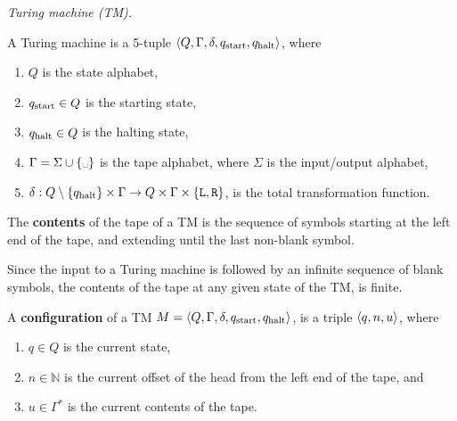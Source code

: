\begin{definition} \emph{Turing machine (TM).}

A Turing machine is a 5-tuple $\mathopen{}\left\langle{Q,\Gamma,\delta,\ensuremath{q_{\text{start}}},\ensuremath{q_{\text{halt}}}}\right\rangle\mathclose{}$, where

\begin{enumerate}

\item $Q$ is the state alphabet,

\item $q_{\text{start}}\in Q$ is the starting state,

\item $q_{\text{halt}}\in Q$ is the halting state,

\item $\Gamma=\Sigma\cup\set{\text{\textvisiblespace}}$ is the tape alphabet,
where $\Sigma$ is the input/output alphabet,

\item $\delta:Q\setminus\mathopen{}\left\{{q_{\text{halt}}}\right\}\mathclose{}\times\Gamma \rightarrow
Q\times\Gamma\times\mathopen{}\left\{{\mathtt{L},\mathtt{R}}\right\}\mathclose{}$, is the total transformation
function.

\end{enumerate}

\end{definition}

\begin{definition}

The \textbf{contents} of the tape of a TM is the sequence of symbols starting
at the left end of the tape, and extending until the last non-blank symbol.

\end{definition}

Since the input to a Turing machine is followed by an infinite sequence of
blank symbols, the contents of the tape at any given state of the TM, is
finite.

\begin{definition}

A \textbf{configuration} of a TM $M=\mathopen{}\left\langle{Q,\Gamma,\delta,\ensuremath{q_{\text{start}}},\ensuremath{q_{\text{halt}}}}\right\rangle\mathclose{}$, is
a triple $\mathopen{}\left\langle{q,n,u}\right\rangle\mathclose{}$, where

\begin{enumerate}

\item $q\in Q$ is the current state,

\item $n\in \mathbb{N}$ is the current offset of the head from the left end of
the tape, and

\item $u\in \Gamma^*$ is the current contents of the tape.

\end{enumerate}

\end{definition}


